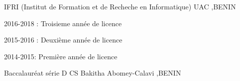 


\begin{cventries}


\cventry
{}%
{IFRI (Institut de Formation et de Recheche en Informatique)} %
{UAC ,BENIN} %
{}%
{ %
\begin{cvitems}
\item {2016-2018 : Troisieme année de licence}
\item {2015-2016 : Deuxième année de licence}
\item {2014-2015: Première année de licence}
\end{cvitems}
}

\cventry
{Baccalauréat série D}
{CS Bakitha}
{Abomey-Calavi ,BENIN}
{}
{}


\end{cventries}